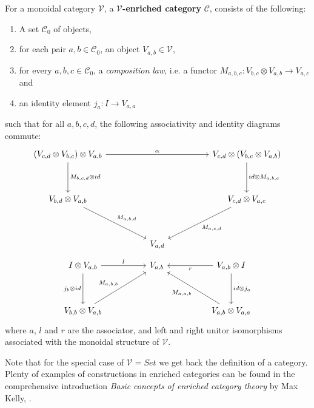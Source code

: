 \begin{defn}\label{enr-cat}
  For a monoidal category $\mathcal{V}$, a \textbf{$\mathcal{V}$-enriched category} $\mathcal{C}$, consists of the following:
  \begin{enumerate}
  \item A set $\mathcal{C}_0$ of objects,
  \item for each pair $a, b \in \mathcal{C}_0$, an object $V_{a,b} \in \mathcal{V}$,
  \item for every $a, b, c \in \mathcal{C}_0$, a \textit{composition law}, i.e. a functor $M_{a, b, c} : V_{b, c} \otimes V_{a, b} \to V_{a, c}$ and
  \item an identity element $j_a : I \to V_{a, a}$
\end{enumerate}
such that for all $a, b, c, d$, the following associativity and identity diagrams commute:
    \[
      \ti
      (V_{c, d} \otimes V_{b, c}) \otimes V_{a, b} \ar[d, "{M_{b, c, d} \otimes id}"] \ar[rr, "\alpha"] & & V_{c, d} \otimes (V_{b, c} \otimes V_{a, b}) \ar[d, "{id \otimes M_{a, b, c}}"]\\
      V_{b, d} \otimes V_{a, b} \ar[rd, "M_{a, b, d}"] & & V_{c, d} \otimes V_{a, c} \ar[ld, "M_{a, c, d}"]\\
      & V_{a, d}      &
      \kz
    \]
    \[
      \ti
      I \otimes V_{a, b} \ar[d, "j_b \otimes id", swap] \ar[r, "l"] & V_{a, b} & V_{a, b} \otimes I \ar[l, "r"] \ar[d, "id \otimes j_a"] \\
      V_{b, b} \otimes V_{a, b} \ar[ru, "M_{a, b, b}"] & & V_{a, b} \otimes V_{a, a} \ar[lu, "M_{a, a, b}"]
      \kz
    \]
    where $a$, $l$ and $r$ are the associator, and left and right unitor isomorphisms associated with the monoidal structure of $\mathcal{V}$.
\end{defn}
Note that for the special case of $\mathcal{V} = Set$ we get back the definition of a category. Plenty of examples of constructions in enriched categories can be found in the comprehensive introduction \textit{Basic concepts of enriched category theory} by Max Kelly, \cite{kelly}.


